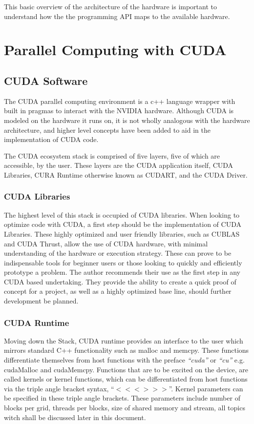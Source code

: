 This basic overview of the architecture of the hardware is important to understand
how the the programming API maps to the available hardware.


\section{Parallel Computing with CUDA}
\subsection{CUDA Software}

The CUDA parallel computing environment is a c++ language wrapper with built in
pragmas to interact with the NVIDIA hardware.  Although CUDA is modeled on the
hardware it runs on, it is not wholly analogous with the hardware architecture,
and higher level concepts have been added to aid in the implementation of CUDA code.
\par
The CUDA ecosystem stack is comprised of five layers, five of which are accessible, by the user.
These layers are the CUDA application itself, CUDA Libraries, CURA Runtime otherwise
known as CUDART, and the CUDA Driver.


\subsubsection{CUDA Libraries}

The highest level of this stack is occupied
of CUDA libraries. When looking to optimize code with CUDA, a
first step should be the implementation of CUDA Libraries.  These highly optimized
and user friendly libraries, such as CUBLAS and CUDA Thrust, allow the use of
CUDA hardware, with minimal understanding of the hardware or execution strategy.  These can prove
to be indispensable tools for beginner users or those looking to quickly and
efficiently prototype a problem. The author recommends their use as the first step
in any CUDA based undertaking. They provide the ability to create a quick proof
of concept for a project, as well as a highly optimized base line, should further
development be planned.
\subsubsection{CUDA Runtime}

Moving down the Stack, CUDA runtime provides an interface to the user which mirrors
standard C++ functionality such as malloc and memcpy.  These functions differentiate
themselves from host functions with the preface \textit{``cuda''} or \textit{``cu''}
e.g. cudaMalloc and cudaMemcpy.  Functions that are to be excited on the
device, are called kernels or kernel functions, which can be differentiated from
host functions via the triple angle bracket syntax, ``$<<< >>>$''.
Kernel parameters can be specified in these triple angle brackets.  These parameters
include number of blocks per grid, threads per blocks, size of shared memory and
stream, all topics witch shall be discussed later in this document. %

